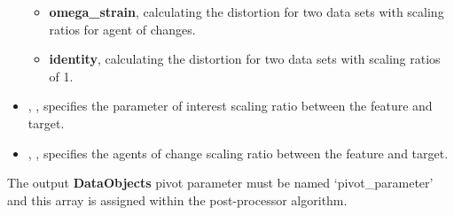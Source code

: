 \begin{itemize}
\begin{itemize}
        \item \textbf{omega\_strain}, calculating the distortion for two data sets with scaling ratios for agent of changes.
        \item \textbf{identity}, calculating the distortion for two data sets with scaling ratios of 1.
      \end{itemize}
    \item {}, , specifies the parameter of interest scaling ratio between the feature and target.
    \item {}, , specifies the agents of change scaling ratio between the feature and target.
\end{itemize}

The output \textbf{DataObjects} pivot parameter must be named `pivot\_parameter' and this array is assigned within the post-processor algorithm.

